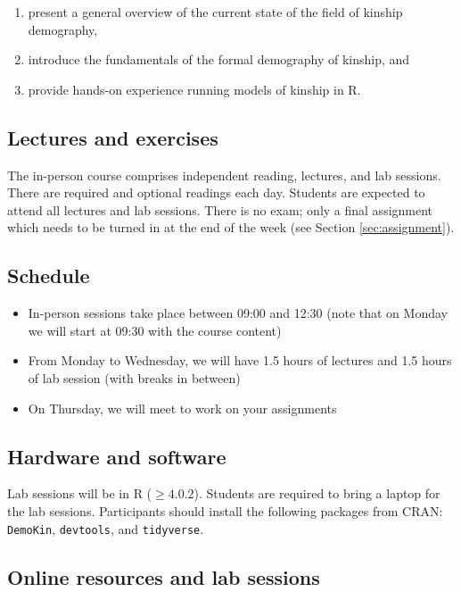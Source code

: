 ﻿\documentclass{article}
\begin{document}
\begin{enumerate}
    \item present a general overview of the current state of the field of kinship demography,
    \item introduce the fundamentals of the formal demography of kinship, and
    \item provide hands-on experience running models of kinship in R.
\end{enumerate}

\subsection{Lectures and exercises}

The in-person course comprises independent reading, lectures, and lab sessions. There are required and optional readings each day. Students are expected to attend all lectures and lab sessions. There is no exam; only a final assignment which needs to be turned in at the end of the week (see Section \ref{sec:assignment}).  

\subsection*{Schedule}

\begin{itemize}
    \item In-person sessions take place between 09:00 and 12:30 (note that on Monday we will start at 09:30 with the course content)
    \item From Monday to Wednesday, we will have 1.5 hours of lectures and 1.5 hours of lab session (with breaks in between)
    \item On Thursday, we will meet to work on your assignments 
\end{itemize}

\subsection{Hardware and software}

Lab sessions will be in R ($\geq4.0.2$). 
Students are required to bring a laptop for the lab sessions. 
Participants should install the following packages from CRAN:  \texttt{DemoKin}, \texttt{devtools}, and \texttt{tidyverse}.

\subsection{Online resources and lab sessions}
\end{document}

